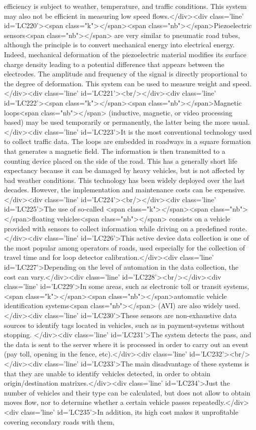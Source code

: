 efficiency is subject to weather, temperature, and traffic conditions. This system may also not be efficient in measuring low speed flows.</div><div class='line' id='LC220'><span class="k">\emph</span><span class="nb">{</span>Piezoelectric sensors<span class="nb">}</span> are very similar to pneumatic road tubes, although the principle is to convert mechanical energy into electrical energy. Indeed, mechanical deformation of the piezoelectric material modifies its surface charge density leading to a potential difference that appears between the electrodes. The amplitude and frequency of the signal is directly proportional to the degree of deformation. This system can be used to measure weight and speed.</div><div class='line' id='LC221'><br/></div><div class='line' id='LC222'><span class="k">\emph</span><span class="nb">{</span>Magnetic loops<span class="nb">}</span> (inductive, magnetic, or video processing based) may be used temporarily or permanently, the latter being the more usual. </div><div class='line' id='LC223'>It is the most conventional technology used to collect traffic data. The loops are embedded in roadways in a square formation that generates a magnetic field. The information is then transmitted to a counting device placed on the side of the road. This has a generally short life expectancy because it can be damaged by heavy vehicles, but is not affected by bad weather conditions. This technology has been widely deployed over the last decades. However, the implementation and maintenance costs can be expensive.</div><div class='line' id='LC224'><br/></div><div class='line' id='LC225'>The use of so-called <span class="k">\emph</span><span class="nb">{</span>floating vehicles<span class="nb">}</span> consists on a vehicle provided with sensors to collect information while driving on a predefined route.</div><div class='line' id='LC226'>This active device data collection is one of the most popular among operators of roads, used especially for the collection of travel time and for loop detector calibration.</div><div class='line' id='LC227'>Depending on the level of automation in the data collection, the cost can vary.</div><div class='line' id='LC228'><br/></div><div class='line' id='LC229'>In some areas, such as electronic toll or transit systems, <span class="k">\emph</span><span class="nb">{</span>automatic vehicle identification systems<span class="nb">}</span> (AVI) are also widely used. </div><div class='line' id='LC230'>These sensors are non-exhaustive data sources to identify tags located in vehicles, such as in payment-systems without stopping. </div><div class='line' id='LC231'>The system detects the pass, and the data is sent to the server where it is processed in order to carry out an event (pay toll, opening in the fence, etc).</div><div class='line' id='LC232'><br/></div><div class='line' id='LC233'>The main disadvantage of these systems is that they are unable to identify vehicles detected, in order to obtain origin/destination matrixes.</div><div class='line' id='LC234'>Just the number of vehicles and their type can be calculated, but does not allow to obtain moves flow, nor to determine whether a certain vehicle passes repeatedly.</div><div class='line' id='LC235'>In addition, its high cost makes it unprofitable covering secondary roads with them, 